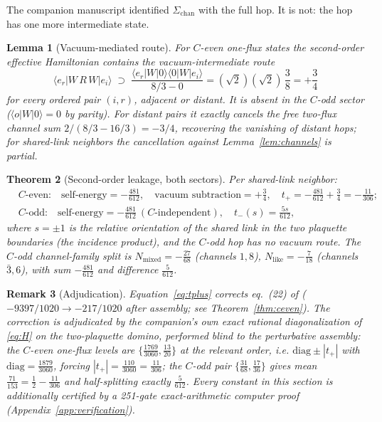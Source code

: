 \documentclass[11pt]{article}
\newtheorem{theorem}{Theorem}[section]
\newtheorem{lemma}[theorem]{Lemma}
\newtheorem{remark}[theorem]{Remark}
\newcommand{\ket}[1]{|#1\rangle}
\newcommand{\bra}[1]{\langle #1|}
\begin{document}
The companion manuscript identified $\Sigma_{\mathrm{chan}}$ with the full
hop. It is not: the hop has one more intermediate state.

\begin{lemma}[Vacuum-mediated route]\label{lem:vacroute}
For $C$-even one-flux states the second-order effective Hamiltonian contains
the vacuum-intermediate route
\begin{equation}
\bra{e_r}W\,R\,W\ket{e_i}\;\supset\;
\frac{\bra{e_r}W\ket{0}\bra{0}W\ket{e_i}}{8/3-0}
=(\sqrt2)(\sqrt2)\,\frac38=+\frac34
\end{equation}
for \emph{every} ordered pair $(i,r)$, adjacent or distant. It is absent in
the $C$-odd sector ($\bra{o}W\ket{0}=0$ by parity). For distant pairs it
exactly cancels the free two-flux channel sum $2/(8/3-16/3)=-3/4$,
recovering the vanishing of distant hops; for shared-link neighbors the
cancellation against Lemma~\ref{lem:channels} is partial.
\end{lemma}

\begin{theorem}[Second-order leakage, both sectors]\label{thm:leakage}
Per shared-link neighbor:
\begin{align}
&C\text{-even:}\quad
\text{self-energy}=-\tfrac{481}{612},\quad
\text{vacuum subtraction}=+\tfrac34,\quad
t_+=-\tfrac{481}{612}+\tfrac34=-\tfrac{11}{306};
\label{eq:tplus}\\[2pt]
&C\text{-odd:}\quad
\text{self-energy}=-\tfrac{481}{612}\ (C\text{-independent}),\quad
t_-(s)=\tfrac{5s}{612},
\end{align}
where $s=\pm1$ is the relative orientation of the shared link in the two
plaquette boundaries (the incidence product), and the $C$-odd hop has no
vacuum route. The $C$-odd channel-family split is
$N_{\mathrm{mixed}}=-\tfrac{27}{68}$ (channels $1,8$),
$N_{\mathrm{like}}=-\tfrac{7}{18}$ (channels $\bar3,6$), with sum
$-\tfrac{481}{612}$ and difference $\tfrac{5}{612}$.
\end{theorem}

\begin{remark}[Adjudication]\label{rem:domino}
Equation~\eqref{eq:tplus} corrects eq.~(22) of \cite{companion}
($-9397/1020\to-217/1020$ after assembly; see Theorem~\ref{thm:ceven}).
The correction is adjudicated by the companion's own exact rational
diagonalization of \eqref{eq:H} on the two-plaquette domino, performed
\emph{blind} to the perturbative assembly: the $C$-even one-flux levels are
$\{\tfrac{1769}{3060},\tfrac{13}{20}\}$ at the relevant order, i.e.
$\mathrm{diag}\pm|t_+|$ with $\mathrm{diag}=\tfrac{1879}{3060}$, forcing
$|t_+|=\tfrac{110}{3060}=\tfrac{11}{306}$; the $C$-odd pair
$\{\tfrac{31}{68},\tfrac{17}{36}\}$ gives mean $\tfrac{71}{153}
=\tfrac12-\tfrac{11}{306}$ and half-splitting exactly $\tfrac{5}{612}$.
Every constant in this section is additionally certified by a 251-gate
exact-arithmetic computer proof (Appendix~\ref{app:verification}).
\end{remark}
\end{document}
